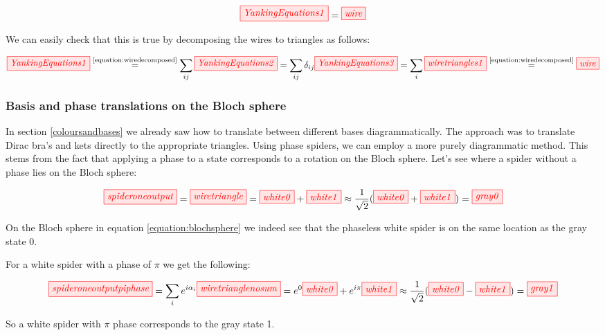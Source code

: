 \documentclass[]{article}
\newcommand{\equaltext}[1]{\ensuremath{\stackrel{\text{#1}}{=}}}
\begin{document}
\begin{equation}
	\label{equation:yankingequation}
	\tikzfig{YankingEquations1} = \tikzfig{wire}
\end{equation}

We can easily check that this is true by decomposing the wires to triangles as follows:

\begin{equation}
	\tikzfig{YankingEquations1} \equaltext{\ref{equation:wiredecomposed}} \sum\limits_{ij} \tikzfig{YankingEquations2} = \sum\limits_{ij} \delta_{ij} \tikzfig{YankingEquations3} = \sum\limits_{i} \tikzfig{wiretriangles1} \equaltext{\ref{equation:wiredecomposed}} \tikzfig{wire}
\end{equation}

\subsubsection{Basis and phase translations on the Bloch sphere}

In section \ref{coloursandbases} we already saw how to translate between different bases diagrammatically. The approach was to translate Dirac bra's and kets directly to the appropriate triangles. Using phase spiders, we can employ a more purely diagrammatic method. This stems from the fact that applying a phase to a state corresponds to a rotation on the Bloch sphere. Let's see where a spider without a phase lies on the Bloch sphere:

\begin{equation}
\tikzfig{spideroneoutput} = \tikzfig{wiretriangle} = \tikzfig{white0} + \tikzfig{white1} \approx \frac{1}{\sqrt{2}}(\tikzfig{white0} + \tikzfig{white1}) = \tikzfig{gray0}
\end{equation}

On the Bloch sphere in equation \ref{equation:blochsphere} we indeed see that the phaseless white spider is on the same location as the gray state 0.

For a white spider with a phase of $\pi$ we get the following:

\begin{equation}
\tikzfig{spideroneoutputpiphase} = \sum\limits_{i} e^{i\alpha_i}\tikzfig{wiretrianglenosum} = e^{0}\tikzfig{white0} + e^{i\pi}\tikzfig{white1} \approx \frac{1}{\sqrt{2}}(\tikzfig{white0} - \tikzfig{white1}) = \tikzfig{gray1}
\end{equation}

So a white spider with $\pi$ phase corresponds to the gray state 1. 
\end{document}
